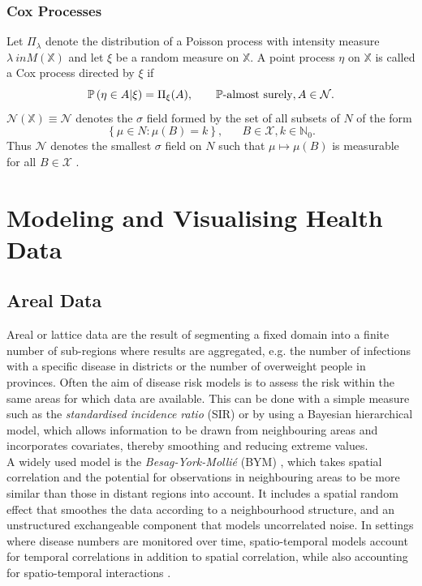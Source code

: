 \subsubsection{Cox Processes}
Let $\Pi_{\lambda}$ denote the distribution of a Poisson process with intensity measure $\lambda\ in M\left(\mathbb{X}\right)$ and let $\xi$ be a random measure on $\mathbb{X}$. A point process $\eta$ on $\mathbb{X}$ is called a Cox process directed by $\xi$ if
\begin{equation}
    \mathbb{P}\left(\eta\in A|\xi\right)=\Pi_{\xi}(A),\hspace{20pt}\mathbb{P}\hbox{-almost surely}, A\in\mathcal{N}.
\end{equation}
$\mathcal{N}\left(\mathbb{X}\right)\equiv\mathcal{N}$ denotes the $\sigma$ field formed by the set of all subsets of $N$ of the form
\begin{equation*}
    \left\lbrace\mu\in N:\mu(B)=k\right\rbrace, \hspace{20pt}B\in\mathcal{X},k\in\mathbb{N}_0.
\end{equation*}
Thus $\mathcal{N}$ denotes the smallest $\sigma$ field on $N$ such that $\mu\mapsto\mu(B)$ is measurable for all $B\in\mathcal{X}$  \autocite[][129]{last2017lectures}.
\clearpage
\section{Modeling and Visualising Health Data}
\subsection{Areal Data}
Areal or lattice data are the result of segmenting a fixed domain into a finite number of sub-regions where results are aggregated, e.g. the number of infections with a specific disease in districts or the number of overweight people in provinces. Often the aim of disease risk models is to assess the risk within the same areas for which data are available. This can be done with a simple measure such as the \textit{standardised incidence ratio} (SIR) or by using a Bayesian hierarchical model, which allows information to be drawn from neighbouring areas and incorporates covariates, thereby smoothing and reducing extreme values. \\
A widely used model is the \textit{Besag-York-Mollié} (BYM) \autocite[][]{besag1991bayesian}, which takes spatial correlation and the potential for observations in neighbouring areas to be more similar than those in distant regions into account. It includes a spatial random effect that smoothes the data according to a neighbourhood structure, and an unstructured exchangeable component that models uncorrelated noise. In settings where disease numbers are monitored over time, spatio-temporal models account for temporal correlations in addition to spatial correlation, while also accounting for spatio-temporal interactions  \autocite[][]{moraga2019geospatial}.
